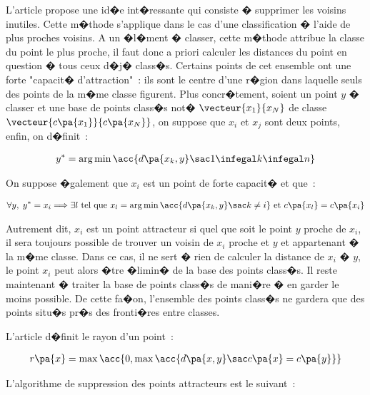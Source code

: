 L'article  propose une id�e int�ressante qui consiste � supprimer les voisins inutiles. Cette m�thode s'applique dans le cas d'une classification � l'aide de plus proches voisins. A un �l�ment � classer, cette m�thode attribue la classe du point le plus proche, il faut donc a priori calculer les distances du point en question � tous ceux d�j� class�s. Certains points de cet ensemble ont une forte "capacit� d'attraction"~: ils sont le centre d'une r�gion dans laquelle seuls des points de la m�me classe figurent. Plus concr�tement, soient un point $y$ � classer et une base de points class�s not� $\vecteur{x_1}{x_N}$ de classe $\vecteur{c\pa{x_1}}{c\pa{x_N}}$, on suppose que $x_i$ et $x_j$ sont deux points, enfin, on d�finit~:

        \begin{eqnarray}
        y^*                     = \arg \min \acc{ d\pa{x_k, y} \sac 1 \infegal k \infegal n }
        \end{eqnarray}

On suppose �galement que $x_i$ est un point de forte capacit� et que~:

        \begin{eqnarray}
        \forall y, \; y^* = x_i \Longrightarrow \exists l \text{ tel que } 
                                        x_l = \arg \min \acc{ d\pa{x_k, y} \sac k \neq i } \text{ et } c\pa{x_l} = c\pa{x_i}
        \end{eqnarray}

Autrement dit, $x_i$ est un point attracteur si quel que soit le point $y$ proche de $x_i$, il sera toujours possible de trouver un voisin de $x_i$ proche et $y$ et appartenant � la m�me classe. Dans ce cas, il ne sert � rien de calculer la distance de $x_i$ � $y$, le point $x_i$ peut alors �tre �limin� de la base des points class�s. Il reste maintenant � traiter la base de points class�s de mani�re � en garder le moins possible. De cette fa�on, l'ensemble des points class�s ne gardera que des points situ�s pr�s des fronti�res entre classes.

L'article  d�finit le rayon d'un point~:

        \begin{eqnarray}
        r\pa{x}  = \max\acc { 0, \max \acc{ d\pa{x, y} \sac c\pa{x} = c\pa{y} } }
        \end{eqnarray}
        
L'algorithme de suppression des points attracteurs est le suivant~:

